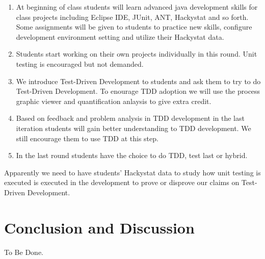 \documentclass[11pt,twocolumn]{article}
\begin{document}
\begin{enumerate}
\item At beginning of class students will learn advanced java development
  skills for class projects including Eclipse IDE, JUnit, ANT, Hackystat
  and so forth. Some assignments will be given to students to practice new
  skills, configure development environment setting and utilize their
  Hackystat data.
\item Students start working on their own projects individually in this
  round. Unit testing is encouraged but not demanded.
\item We introduce Test-Driven Development to students and ask them to try
  to do Test-Driven Development. To enourage TDD adoption we will use the
  process graphic viewer and quantification anlaysis to give extra
  credit. 
\item Based on feedback and problem analysis in TDD development in the last
  iteration students will gain better understanding to TDD development. We
  still encourage them to use TDD at this step.
\item In the last round students have the choice to do TDD, test last or
  hybrid.
\end{enumerate}

Apparently we need to have students' Hackystat data to study how unit
testing is executed is executed in the development to prove or disprove our
claims on Test-Driven Development.

\section{Conclusion and Discussion}
\label{sec:discuss}

To Be Done.


\end{document}
